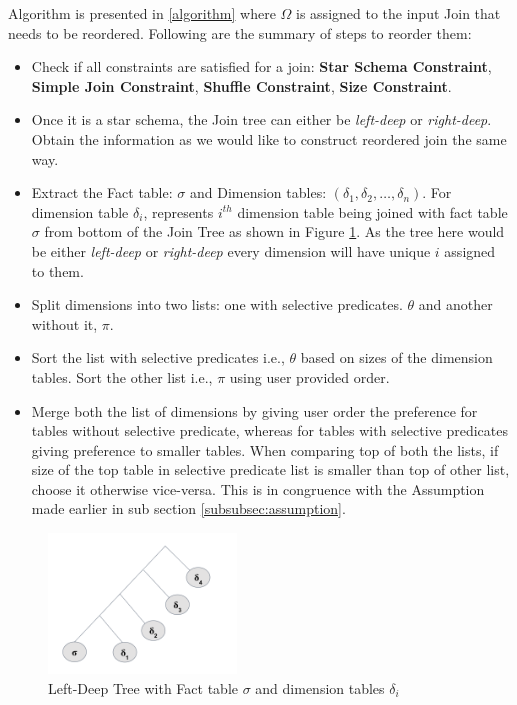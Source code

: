 Algorithm is presented in \ref{algorithm} where $\Omega$ is assigned to the input Join that needs to be reordered. Following are the summary of steps to reorder them:
\begin{itemize}
\item Check if all constraints are satisfied for a join: \textbf{Star Schema Constraint}, \textbf{Simple Join Constraint}, \textbf{Shuffle Constraint}, \textbf{Size Constraint}.
\item Once it is a star schema, the Join tree can either be \textit{left-deep} or \textit{right-deep}. Obtain the information as we would like to construct reordered join the same way.
\item Extract the Fact table: $\sigma$ and Dimension tables: $ (\delta_1, \delta_2, \ldots, \delta_n)$. For dimension table $\delta_i$, represents  $i^{th}$ dimension table being joined with fact table $\sigma$ from bottom of the Join Tree as shown in Figure \ref{left-deep}. As the tree here would be either \textit{left-deep} or \textit{right-deep} every dimension will have unique $i$ assigned to them. 
\item Split dimensions into two lists: one with selective predicates. $\theta$ and another without it, $\pi$.
\item Sort the list with selective predicates i.e., $\theta$ based on sizes of the dimension tables. Sort the other list i.e., $\pi$ using user provided order.
\item Merge both the list of dimensions by giving user order the preference for tables without selective predicate, whereas for tables with selective predicates giving preference to smaller tables. When comparing top of both the lists, if size of the top table in selective predicate list is smaller than top of other list, choose it otherwise vice-versa. This is in congruence with the Assumption made earlier in sub section \ref{subsubsec:assumption}.
\end{itemize}

\begin{figure}[ht]
\centerline{\includegraphics[width=5cm]{fig/left-deep.png}}
\caption{Left-Deep Tree with Fact table $\sigma$ and dimension tables $\delta_i$}
\label{left-deep}
\end{figure}

